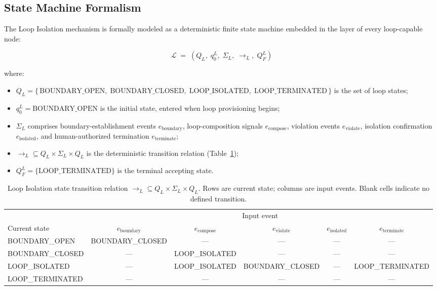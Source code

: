 \subsection{State Machine Formalism}\label{sec:loop-state-machine}

The Loop Isolation mechanism is formally modeled as a deterministic finite state machine embedded in the \fact{} layer of every loop-capable node:

\[
\mathcal{L} \;=\; (Q_L,\; q_0^L,\; \Sigma_L,\; \rightarrow_L,\; Q_F^L)
\]

where:

\begin{itemize}\itemsep=0pt
\item $Q_L = \{\,\text{BOUNDARY\_OPEN},\; \text{BOUNDARY\_CLOSED},\; \text{LOOP\_ISOLATED},\; \text{LOOP\_TERMINATED}\,\}$ is the set of loop states;
\item $q_0^L = \text{BOUNDARY\_OPEN}$ is the initial state, entered when loop provisioning begins;
\item $\Sigma_L$ comprises boundary-establishment events $e_{\text{boundary}}$, loop-composition signals $e_{\text{compose}}$, violation events $e_{\text{violate}}$, isolation confirmation $e_{\text{isolated}}$, and human-authorized termination $e_{\text{terminate}}$;
\item $\rightarrow_L \subseteq Q_L \times \Sigma_L \times Q_L$ is the deterministic transition relation (Table~\ref{tab:loop-transition});
\item $Q_F^L = \{\text{LOOP\_TERMINATED}\}$ is the terminal accepting state.
\end{itemize}

\begin{table}[htbp]
\caption{Loop Isolation state transition relation $\rightarrow_L \subseteq Q_L \times \Sigma_L \times Q_L$. Rows are current state; columns are input events. Blank cells indicate no defined transition.}
\label{tab:loop-transition}
\begin{tabular}{@{}lccccc@{}}
\toprule
 & \multicolumn{5}{c}{Input event} \\
\cmidrule(l){2-6}
Current state & $e_{\text{boundary}}$ & $e_{\text{compose}}$ & $e_{\text{violate}}$ & $e_{\text{isolated}}$ & $e_{\text{terminate}}$ \\
\midrule
BOUNDARY\_OPEN & BOUNDARY\_CLOSED & — & — & — & — \\
BOUNDARY\_CLOSED & — & LOOP\_ISOLATED & — & — & — \\
LOOP\_ISOLATED & — & LOOP\_ISOLATED & BOUNDARY\_CLOSED & — & LOOP\_TERMINATED \\
LOOP\_TERMINATED & — & — & — & — & — \\
\bottomrule
\end{tabular}
\end{table}

